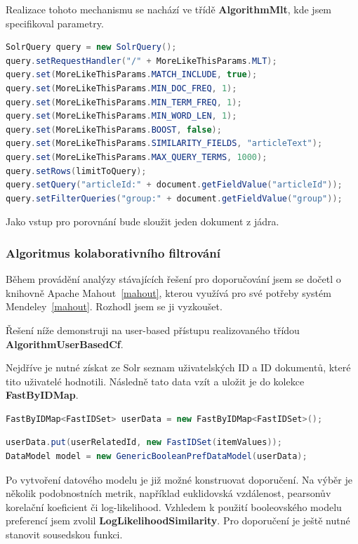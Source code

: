 \documentclass[thesis=M,czech]{FITthesis}[2014/05/07]
\begin{document}
Realizace tohoto mechanismu se nachází ve třídě \textbf{AlgorithmMlt}, kde jsem specifikoval parametry. 

\begin{lstlisting}[language=java]
SolrQuery query = new SolrQuery();
query.setRequestHandler("/" + MoreLikeThisParams.MLT);
query.set(MoreLikeThisParams.MATCH_INCLUDE, true);
query.set(MoreLikeThisParams.MIN_DOC_FREQ, 1);
query.set(MoreLikeThisParams.MIN_TERM_FREQ, 1);
query.set(MoreLikeThisParams.MIN_WORD_LEN, 1);
query.set(MoreLikeThisParams.BOOST, false);
query.set(MoreLikeThisParams.SIMILARITY_FIELDS, "articleText");
query.set(MoreLikeThisParams.MAX_QUERY_TERMS, 1000);
query.setRows(limitToQuery);
query.setQuery("articleId:" + document.getFieldValue("articleId"));
query.setFilterQueries("group:" + document.getFieldValue("group"));
\end{lstlisting}

Jako vstup pro porovnání bude sloužit jeden dokument z jádra.

\subsubsection{Algoritmus kolaborativního filtrování}
Během provádění analýzy stávajících řešení pro doporučování jsem se dočetl o knihovně Apache Mahout~\ref{mahout}, kterou využívá pro své potřeby systém Mendeley~\ref{mahout}. Rozhodl jsem se ji vyzkoušet.

Řešení níže demonstruji na user-based přístupu realizovaného třídou \textbf{AlgorithmUserBasedCf}.

Nejdříve je nutné získat ze Solr seznam uživatelských ID a ID dokumentů, které tito uživatelé hodnotili. Následně tato data vzít a uložit je do kolekce \textbf{FastByIDMap}.

\begin{lstlisting}[language=java]
FastByIDMap<FastIDSet> userData = new FastByIDMap<FastIDSet>();
\end{lstlisting}

\begin{lstlisting}[language=java]
userData.put(userRelatedId, new FastIDSet(itemValues));
DataModel model = new GenericBooleanPrefDataModel(userData);
\end{lstlisting}

Po vytvoření datového modelu je již možné konstruovat doporučení. Na výběr je několik podobnostních metrik, například euklidovská vzdálenost, pearsonův korelační koeficient či log-likelihood. Vzhledem k použití booleovského modelu preferencí jsem zvolil \textbf{LogLikelihoodSimilarity}. Pro doporučení je ještě nutné stanovit sousedskou funkci.
\end{document}
